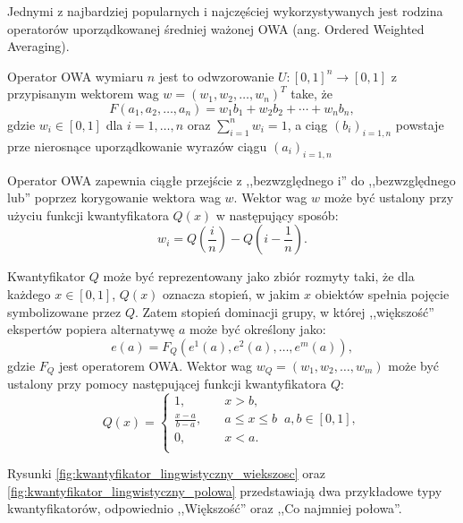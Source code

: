 Jednymi z najbardziej popularnych i najczęściej wykorzystywanych jest rodzina
operatorów uporządkowanej średniej ważonej OWA (ang. Ordered Weighted
Averaging).

\begin{definition}
Operator OWA wymiaru $n$ jest to odwzorowanie $U : [0,1]^n \rightarrow [0,1]$
z przypisanym wektorem wag $w=(w_1,w_2,\dotsc,w_n)^T$ take, że
\begin{equation}
F(a_1,a_2,\dotsc,a_n) = w_1b_1 + w_2b_2 + \dotsb + w_nb_n,
\end{equation}
gdzie $w_i \in [0,1]$ dla $i=1,\dotsc, n$ oraz $\sum_{i=1}^{n} w_i = 1$, a ciąg
$(b_i)_{i=1,n}$ powstaje prze nierosnące uporządkowanie wyrazów ciągu
$(a_i)_{i=1,n}$
\end{definition}

Operator OWA zapewnia ciągłe przejście z ,,bezwzględnego i'' do ,,bezwzględnego
lub'' poprzez korygowanie wektora wag $w$. Wektor wag $w$ może być ustalony przy
użyciu funkcji kwantyfikatora $Q(x)$ w następujący sposób:
$$w_i = Q(\frac{i}{n}) - Q(i - \frac{1}{n}).$$

Kwantyfikator $Q$ może być reprezentowany jako zbiór rozmyty taki, że dla
każdego $x \in [0,1]$, $Q(x)$ oznacza stopień, w jakim $x$ obiektów spełnia
pojęcie symbolizowane przez $Q$. Zatem stopień dominacji grupy, w której
,,większość'' ekspertów popiera alternatywę $a$ może być określony jako:
$$e(a) = F_Q(e^1(a),e^2(a),\dotsc,e^m(a)),$$
gdzie $F_Q$ jest operatorem OWA. Wektor wag $w_Q = (w_1,w_2,\dotsc,w_m)$ może
być ustalony przy pomocy następującej funkcji kwantyfikatora $Q$:
$$
Q(x) = 
\left\{ 
	\begin{array}{cl}
	  1	,				& \quad  x > b, \\
      \frac{x-a}{b-a}, 	& \quad  a \leq x \leq b \;\; a,b \in [0,1], \\
      0 ,				& \quad  x < a. \\
  	\end{array} 
  \right.
$$

Rysunki \ref{fig:kwantyfikator_lingwistyczny_wiekszosc} oraz
\ref{fig:kwantyfikator_lingwistyczny_polowa} przedstawiają dwa przykładowe typy
kwantyfikatorów, odpowiednio ,,Większość'' oraz ,,Co najmniej połowa''.

